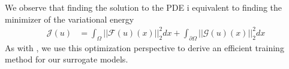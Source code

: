 We observe that finding the solution to the PDE i equivalent to finding
the minimizer of the variational energy
\begin{align*}
  \mathcal{J}(u) &= \int_{\Omega} ||\mathcal{F}(u)(x)||^2_2 dx +
  \int_{\partial\Omega} ||\mathcal{G}(u)(x)||_2^2 dx
\end{align*}
As with \citet{xue2020amortized}, we use this optimization perspective
to derive an efficient training method for our surrogate models.
